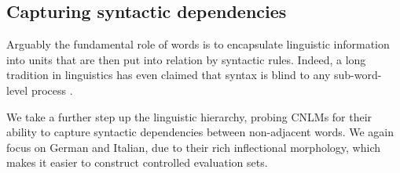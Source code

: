 \subsection{Capturing syntactic dependencies}
\label{sec:dependencies}

Arguably the fundamental role of words is to encapsulate linguistic
information into units that are then put into relation by syntactic
rules. Indeed, a long tradition in linguistics has even claimed that
syntax is blind to any sub-word-level process
\cite[e.g.,][]{Chomsky:1970,DiSciullo:Williams:1987,Bresnan:Mchombo:1995,Williams:2007}.




We take a further step up the linguistic hierarchy, probing CNLMs for their ability to capture syntactic dependencies between non-adjacent words. %
We again focus on German and Italian, due to their rich inflectional morphology, which makes it easier to construct controlled evaluation sets.%





